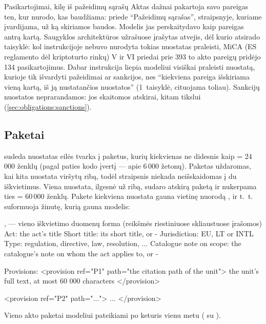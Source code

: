 \begin{lessonbox}{Pasikartojimai, kilę iš pažeidimų sąrašų}
Aktas dažnai pakartoja savo pareigas ten, kur nurodo, kas baudžiama: priede \enquote{Pažeidimų
sąrašas}, straipsnyje, kuriame įvardijama, už ką skiriamos baudos. Modelis jas perskaitydavo kaip
pareigas antrą kartą. Saugyklos architektūros užrašuose įrašytas atvejis, dėl kurio atsirado
taisyklė: kol instrukcijoje nebuvo nurodyta tokias nuostatas praleisti, MiCA (ES reglamento dėl
kriptoturto rinkų) V ir VI priedai prie 393 to akto pareigų pridėjo 134 pasikartojimus. Dabar
instrukcija liepia modeliui visiškai praleisti nuostatą, kurioje tik išvardyti pažeidimai ar
sankcijos, nes \enquote{kiekviena pareiga išskiriama vieną kartą, iš ją nustatančios nuostatos}
(1~taisyklė, cituojama toliau). Sankcijų nuostatos neprarandamos: jos skaitomos atskirai, kitam
tikslui (\cref{sec:obligations:sanctions}).
\end{lessonbox}

\subsection{Paketai}

 sudeda nuostatas eilės tvarka į paketus, kurių kiekvienas ne didesnis kaip
 = 24\,000 ženklų (pagal paties kodo įvertį --- apie 6\,000 žetonų). Paketas
uždaromas, kai kita nuostata viršytų ribą, todėl straipsnis niekada neišskaidomas į du
iškvietimus. Viena nuostata, ilgesnė už ribą, sudaro atskirą paketą ir nukerpama ties
 = 60\,000 ženklų. Pakete kiekviena nuostata gauna vietinę nuorodą
,  ir t.~t.  suformuoja žinutę, kurią gauna modelis:

\begin{codefile}{,  --- vieno iškvietimo duomenų forma (reikšmės riestiniuose skliaustuose įrašomos)}
Act: {the act's title}
Short title: {its short title, or -}
Jurisdiction: {EU, LT or INTL}
Type: {regulation, directive, law, resolution, ...}
Catalogue note on scope: {the catalogue's note on whom the act applies to, or -}

Provisions:
<provision ref="P1" path="{the citation path of the unit}">
{the unit's full text, at most 60 000 characters}
</provision>

<provision ref="P2" path="...">
...
</provision>
\end{codefile}

Vieno akto paketai modeliui pateikiami po keturis vienu metu ( su
).


